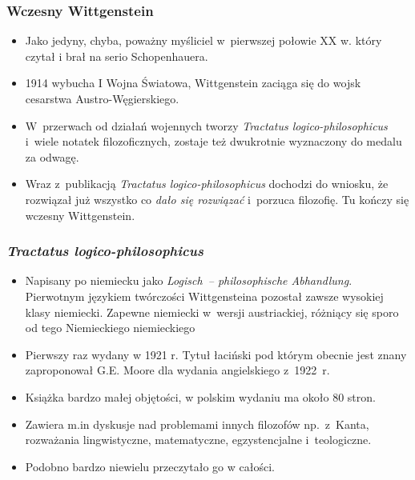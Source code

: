 \documentclass[10pt,t]{beamer}
\begin{document}
\begin{frame}
  \frametitle{Wczesny Wittgenstein}


  \begin{itemize}

  \item Jako jedyny, chyba, poważny myśliciel w~pierwszej połowie XX w.
    który czytał i brał na serio Schopenhauera.

  \item 1914 wybucha I Wojna Światowa, Wittgenstein zaciąga się do
    wojsk cesarstwa Austro-Węgierskiego.

  \item W~przerwach od działań wojennych tworzy \textit{Tractatus
      logico-philosophicus} i~wiele notatek filozoficznych, zostaje
    też dwukrotnie wyznaczony do medalu za odwagę.

  \item Wraz z~publikacją \textit{Tractatus logico-philosophicus}
    dochodzi do wniosku, że rozwiązał już wszystko co \textit{dało się
      rozwiązać} i~porzuca filozofię. Tu kończy się wczesny
    Wittgenstein.

  \end{itemize}

\end{frame}





\begin{frame}
  \frametitle{\textit{Tractatus logico-philosophicus}}

  \begin{itemize}

  \item Napisany po niemiecku jako \textit{Logisch~-- philosophische
      Abhandlung}. Pierwotnym językiem twórczości Wittgensteina pozostał
    zawsze wysokiej klasy niemiecki. Zapewne niemiecki w~wersji
    austriackiej, różniący się sporo od tego Niemieckiego niemieckiego

  \item Pierwszy raz wydany w 1921 r. Tytuł łaciński pod którym obecnie
    jest znany zaproponował G.E. Moore dla wydania angielskiego z~1922~r.

  \item Książka bardzo małej objętości, w polskim wydaniu ma około 80 stron.

  \item Zawiera m.in dyskusje nad problemami innych filozofów
    np.~z~Kanta, rozważania lingwistyczne, matematyczne,
    egzystencjalne i~teologiczne.

  \item Podobno bardzo niewielu przeczytało go w całości.

  \end{itemize}

\end{frame}
\end{document}
